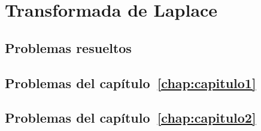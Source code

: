 \documentclass[a4paper, 10pt]{book}
\begin{document}
\chapter{Transformada de Laplace}
\label{chap:capitulo6}


\begin{appendices}

\chapter{Problemas resueltos}

\section[Problemas del capítulo 1]{Problemas del capítulo~\ref{chap:capitulo1}}


\section[Problemas del capítulo 2]{Problemas del capítulo~\ref{chap:capitulo2}}


\end{appendices}
\end{document}
